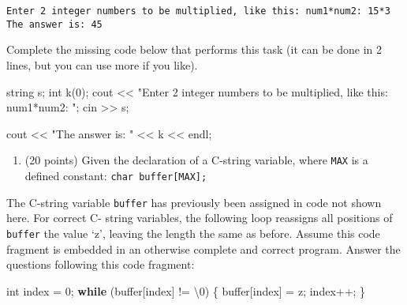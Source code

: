 \documentclass[
]{article}
\newenvironment{Shaded}{}{}
\newcommand{\CharTok}[1]{\textcolor[rgb]{0.25,0.44,0.63}{#1}}
\newcommand{\ControlFlowTok}[1]{\textcolor[rgb]{0.00,0.44,0.13}{\textbf{#1}}}
\newcommand{\DataTypeTok}[1]{\textcolor[rgb]{0.56,0.13,0.00}{#1}}
\newcommand{\DecValTok}[1]{\textcolor[rgb]{0.25,0.63,0.44}{#1}}
\newcommand{\NormalTok}[1]{#1}
\newcommand{\SpecialCharTok}[1]{\textcolor[rgb]{0.25,0.44,0.63}{#1}}
\newcommand{\StringTok}[1]{\textcolor[rgb]{0.25,0.44,0.63}{#1}}
\providecommand{\tightlist}{%
  \setlength{\itemsep}{0pt}\setlength{\parskip}{0pt}}
\begin{document}
\begin{verbatim}
Enter 2 integer numbers to be multiplied, like this: num1*num2: 15*3
The answer is: 45
\end{verbatim}

Complete the missing code below that performs this task (it can be done
in 2 lines, but you can use more if you like).

\begin{Shaded}
\begin{Highlighting}[]
\NormalTok{string s; }\DataTypeTok{int}\NormalTok{ k(}\DecValTok{0}\NormalTok{);}
\NormalTok{cout \textless{}\textless{} }\StringTok{"Enter 2 integer numbers to be multiplied, like this: num1*num2: "}\NormalTok{;}
\NormalTok{cin \textgreater{}\textgreater{} s;}




\NormalTok{cout \textless{}\textless{} }\StringTok{"The answer is: "}\NormalTok{ \textless{}\textless{} k \textless{}\textless{} endl; }
\end{Highlighting}
\end{Shaded}

\begin{enumerate}
\def\labelenumi{\arabic{enumi}.}
\setcounter{enumi}{2}
\tightlist
\item
  (20 points) Given the declaration of a C-string variable, where
  \texttt{MAX} is a defined constant: \texttt{char\ buffer{[}MAX{]};}
\end{enumerate}

The C-string variable \texttt{buffer} has previously been assigned in
code not shown here. For correct C- string variables, the following loop
reassigns all positions of \texttt{buffer} the value `z', leaving the
length the same as before. Assume this code fragment is embedded in an
otherwise complete and correct program. Answer the questions following
this code fragment:

\begin{Shaded}
\begin{Highlighting}[]
\DataTypeTok{int}\NormalTok{ index = }\DecValTok{0}\NormalTok{;}
\ControlFlowTok{while}\NormalTok{ (buffer[index] != }\CharTok{\textquotesingle{}}\SpecialCharTok{\textbackslash{}0}\CharTok{\textquotesingle{}}\NormalTok{) \{}
\NormalTok{   buffer[index] = }\CharTok{\textquotesingle{}z\textquotesingle{}}\NormalTok{;}
\NormalTok{   index++;}
\NormalTok{\}}
\end{Highlighting}
\end{Shaded}
\end{document}
